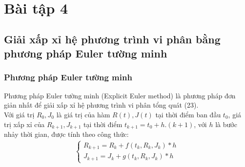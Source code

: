 \section{Bài tập 4}
\subsection{Giải xấp xỉ hệ phương trình vi phân bằng phương pháp Euler tường minh}
\subsubsection{Phương pháp Euler tường minh}
\hspace*{0.5cm} {Phương pháp Euler tường minh (Explicit Euler method) là phương pháp đơn giản nhất để giải xấp xỉ hệ phương trình vi phân tổng quát (23).} \\
\hspace*{0.5cm} {Với giá trị $R_0, J_0$ là giá trị của hàm $R(t), J(t)$ tại thời điểm ban đầu $t_0$, giá trị xấp xỉ của $R_{k+1}, J_{k+1}$ tại thời điểm $t_{k+1} = t_0 + h.(k+1)$, với $h$ là bước nhảy thời gian, được tính theo công thức:} 
\begin{align}
    \begin{cases}
        R_{k+1} = R_k + f(t_k, R_k, J_k) * h\\
        J_{k+1} = J_k + g(t_k, R_k, J_k) * h
    \end{cases}
\end{align}
